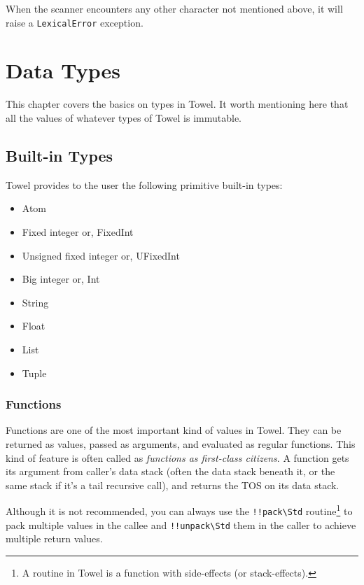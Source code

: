 \documentclass{report}
\newcommand{\mstd}[1]{\texttt{#1\textbackslash Std}}
\begin{document}
When the scanner encounters any other character not mentioned above, it will raise a \texttt{LexicalError} exception.

\chapter{Data Types}
\label{chap:data-types}

This chapter covers the basics on types in Towel. It worth mentioning here that all the values of whatever types of Towel is immutable.

\section{Built-in Types}

Towel provides to the user the following primitive built-in types:
\begin{itemize}
\item Atom
\item Fixed integer or, FixedInt
\item Unsigned fixed integer or, UFixedInt
\item Big integer or, Int
\item String
\item Float
\item List
\item Tuple
\end{itemize}

\subsection{Functions}

Functions are one of the most important kind of values in Towel. They can be returned as values, passed as arguments, and evaluated as regular functions. This kind of feature is often called as \textit{functions as first-class citizens}. A function gets its argument from caller's data stack (often the data stack beneath it, or the same stack if it's a tail recursive call), and returns the TOS on its data stack.

\begin{mdframed}[style=hint]
Although it is not recommended, you can always use the \mstd{!!pack} routine\footnote{A routine in Towel is a function with side-effects (or stack-effects).} to pack multiple values in the callee and \mstd{!!unpack} them in the caller to achieve multiple return values.
\end{mdframed}
\end{document}
